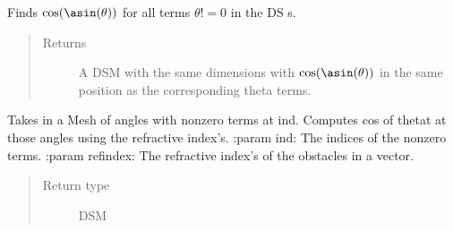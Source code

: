 \documentclass[letterpaper,10pt,english]{sphinxmanual}
\begin{document}
\begin{fulllineitems}
\begin{fulllineitems}
\begin{quote}
\begin{description}
\end{description}\end{quote}

\end{fulllineitems}


\begin{fulllineitems}
\label{\detokenize{index:DictionarySparseMatrix.DS.cos_asin}}
Finds \(\cos( \asin( \theta))\) for all terms     \(\theta != 0\) in the DS s.
\begin{quote}\begin{description}
\item[{Returns}] \leavevmode
A DSM with the same dimensions with     \(\cos( \asin( \theta))\) in the      same position as the corresponding theta terms.

\end{description}\end{quote}

\end{fulllineitems}


\begin{fulllineitems}
\label{\detokenize{index:DictionarySparseMatrix.DS.costhetat}}
Takes in a Mesh of angles with nonzero terms at ind. Computes
cos of thetat at those angles using the refractive index’s.
:param ind: The indices of the nonzero terms.
:param refindex: The refractive index’s of the obstacles in a vector.

\begin{sphinxVerbatim}[commandchars=\\\{\}]
\end{sphinxVerbatim}
\begin{quote}\begin{description}
\item[{Return type}] \leavevmode
DSM


\end{description}
\end{quote}
\end{fulllineitems}
\end{fulllineitems}
\end{document}
